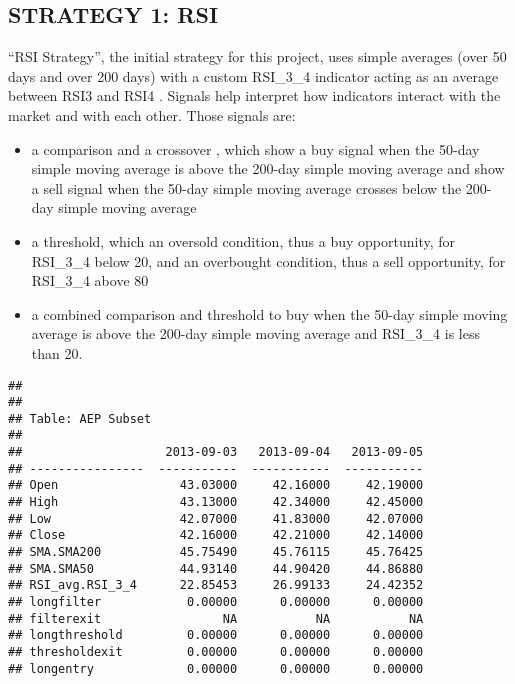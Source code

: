 \documentclass[12pt,]{article}
\providecommand{\tightlist}{%
  \setlength{\itemsep}{0pt}\setlength{\parskip}{0pt}}
\begin{document}
\subsection{STRATEGY 1: RSI}\label{strategy-1-rsi}

``RSI Strategy'', the initial strategy for this project, uses simple
averages (over 50 days and over 200 days) with a custom RSI\_3\_4
indicator acting as an average between RSI3 and RSI4 . Signals help
interpret how indicators interact with the market and with each other.
Those signals are:

\begin{itemize}
\tightlist
\item
  a comparison and a crossover , which show a buy signal when the 50-day
  simple moving average is above the 200-day simple moving average and
  show a sell signal when the 50-day simple moving average crosses below
  the 200-day simple moving average
\item
  a threshold, which an oversold condition, thus a buy opportunity, for
  RSI\_3\_4 below 20, and an overbought condition, thus a sell
  opportunity, for RSI\_3\_4 above 80
\item
  a combined comparison and threshold to buy when the 50-day simple
  moving average is above the 200-day simple moving average and
  RSI\_3\_4 is less than 20.
\end{itemize}

\begin{verbatim}
## 
## 
## Table: AEP Subset
## 
##                    2013-09-03   2013-09-04   2013-09-05
## ----------------  -----------  -----------  -----------
## Open                 43.03000     42.16000     42.19000
## High                 43.13000     42.34000     42.45000
## Low                  42.07000     41.83000     42.07000
## Close                42.16000     42.21000     42.14000
## SMA.SMA200           45.75490     45.76115     45.76425
## SMA.SMA50            44.93140     44.90420     44.86880
## RSI_avg.RSI_3_4      22.85453     26.99133     24.42352
## longfilter            0.00000      0.00000      0.00000
## filterexit                 NA           NA           NA
## longthreshold         0.00000      0.00000      0.00000
## thresholdexit         0.00000      0.00000      0.00000
## longentry             0.00000      0.00000      0.00000
\end{verbatim}
\end{document}

